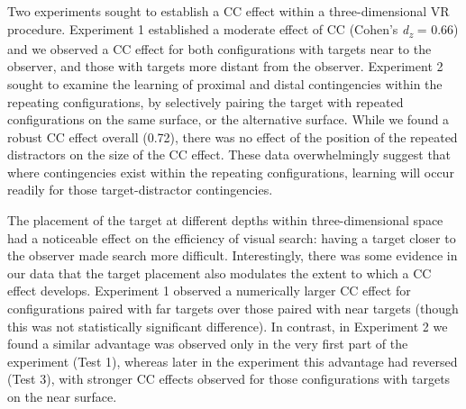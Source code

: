 \documentclass[
  english,
  man,floatsintext]{apa7}
\begin{document}
Two experiments sought to establish a CC effect within a three-dimensional VR procedure. Experiment 1 established a moderate effect of CC (Cohen's \emph{d\textsubscript{z}} = 0.66) and we observed a CC effect for both configurations with targets near to the observer, and those with targets more distant from the observer. Experiment 2 sought to examine the learning of proximal and distal contingencies within the repeating configurations, by selectively pairing the target with repeated configurations on the same surface, or the alternative surface. While we found a robust CC effect overall (0.72), there was no effect of the position of the repeated distractors on the size of the CC effect. These data overwhelmingly suggest that where contingencies exist within the repeating configurations, learning will occur readily for those target-distractor contingencies.

The placement of the target at different depths within three-dimensional space had a noticeable effect on the efficiency of visual search: having a target closer to the observer made search more difficult. Interestingly, there was some evidence in our data that the target placement also modulates the extent to which a CC effect develops. Experiment 1 observed a numerically larger CC effect for configurations paired with far targets over those paired with near targets (though this was not statistically significant difference). In contrast, in Experiment 2 we found a similar advantage was observed only in the very first part of the experiment (Test 1), whereas later in the experiment this advantage had reversed (Test 3), with stronger CC effects observed for those configurations with targets on the near surface.
\end{document}
